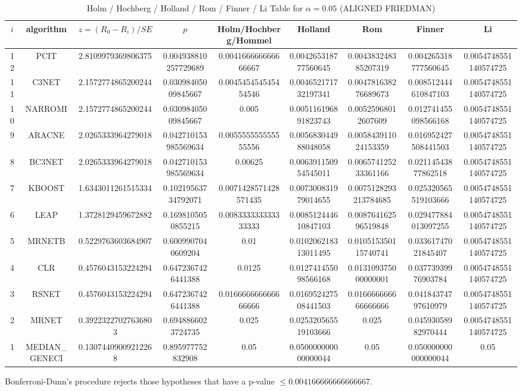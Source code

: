 \documentclass[a4paper,10pt]{article}
\begin{document}
\begin{landscape}
\begin{table}[!htp]
\centering\scriptsize
\caption{Holm / Hochberg / Holland / Rom / Finner / Li Table for $\alpha=0.05$ (ALIGNED FRIEDMAN)}
\begin{tabular}{ccccccccc}
$i$&algorithm&$z=(R_0 - R_i)/SE$&$p$&Holm/Hochberg/Hommel&Holland&Rom&Finner&Li\\
\hline
12&PCIT&2.8109979369806375&0.004938810257729689&0.004166666666666667&0.004265318777560645&0.004383248385207319&0.004265318777560645&0.0054748551140574725\\
11&C3NET&2.1572774865200244&0.03098405009845667&0.004545454545454546&0.004652171732197341&0.004781638276689673&0.008512444610847103&0.0054748551140574725\\
10&NARROMI&2.1572774865200244&0.03098405009845667&0.005&0.005116196891823743&0.00525968012607609&0.012741455098566168&0.0054748551140574725\\
9&ARACNE&2.0265333964279018&0.042710153985569634&0.005555555555555556&0.005683044988048058&0.005843911024153359&0.016952427508441503&0.0054748551140574725\\
8&BC3NET&2.0265333964279018&0.042710153985569634&0.00625&0.006391150954545011&0.006574125233361166&0.02114543877862518&0.0054748551140574725\\
7&KBOOST&1.6343011261515334&0.10219563734792071&0.0071428571428571435&0.007300831979014655&0.0075128293213784685&0.025320565519103666&0.0054748551140574725\\
6&LEAP&1.3728129459672882&0.1698105050855215&0.008333333333333333&0.008512444610847103&0.008764162596519848&0.029477884013097255&0.0054748551140574725\\
5&MRNETB&0.5229763603684907&0.6009907040609204&0.01&0.010206218313011495&0.010515350115740741&0.03361747021845407&0.0054748551140574725\\
4&CLR&0.4576043153224294&0.6472367426441388&0.0125&0.012741455098566168&0.013109375000000001&0.03773939976903784&0.0054748551140574725\\
3&RSNET&0.4576043153224294&0.6472367426441388&0.016666666666666666&0.016952427508441503&0.016666666666666666&0.04184374797610979&0.0054748551140574725\\
2&MRNET&0.39223227027636803&0.6948866023724735&0.025&0.025320565519103666&0.025&0.04593058982970444&0.0054748551140574725\\
1&MEDIAN_GENECI&0.13074409009212268&0.895977752832908&0.05&0.050000000000000044&0.05&0.050000000000000044&0.05\\
\hline
\end{tabular}
\end{table}
Bonferroni-Dunn's procedure rejects those hypotheses that have a p-value $\le0.004166666666666667$.



\end{landscape}
\end{document}
